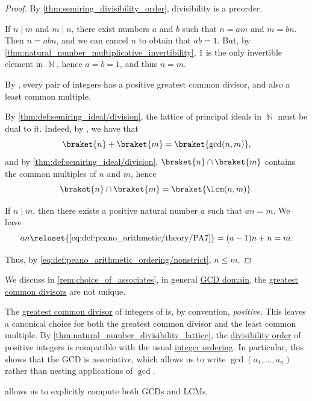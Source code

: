 \begin{proof}
  By \cref{thm:semiring_divisibility_order}, divisibility is a preorder.

   If \( n \mid m \) and \( m \mid n \), there exist numbers \( a \) and \( b \) such that \( n = am \) and \( m = bn \). Then \( n = abn \), and we can cancel \( n \) to obtain that \( ab = 1 \). But, by \cref{thm:natural_number_multiplicative_invertibility}, \( 1 \) is the only invertible element in \( \BbbN \), hence \( a = b = 1 \), and thus \( n = m \).

   By , every pair of integers has a positive greatest common divisor, and also a least common multiple.

  By \cref{thm:def:semiring_ideal/division}, the lattice of principal ideals in \( \BbbN \) must be dual to it. Indeed, by , we have that
  \begin{equation*}
    \braket{n} + \braket{m} = \braket{ \gcd(n, m) },
  \end{equation*}
  and by \cref{thm:def:semiring_ideal/division}, \( \braket{n} \cap \braket{m} \) contains the common multiples of \( n \) and \( m \), hence
  \begin{equation*}
    \braket{n} \cap \braket{m} = \braket{ \lcm(n, m) }.
  \end{equation*}

   If \( n \mid m \), then there exists a positive natural number \( a \) such that \( an = m \). We have
  \begin{equation*}
    an
    \reloset {\eqref{eq:def:peano_arithmetic/theory/PA7}} =
    (a - 1)n + n
    =
    m.
  \end{equation*}

  Thus, by \eqref{eq:def:peano_arithmetic_ordering/nonstrict}, \( n \leq m \).
\end{proof}

\begin{remark}\label{rem:integer_gcd}
  We discuss in \cref{rem:choice_of_associates}, in general \hyperref[def:gcd_domain]{GCD domain}, the \hyperref[def:gcd]{greatest common divisors} are not unique.

  The \hyperref[def:gcd]{greatest common divisor} of integers of is, by convention, \emph{positive}. This leaves a canonical choice for both the greatest common divisor and the least common multiple. By \cref{thm:natural_number_divisibility_lattice}, the \hyperref[thm:semiring_divisibility_order]{divisibility order} of positive integers is compatible with the usual \hyperref[def:integer_ordering]{integer ordering}. In particular, this shows that the GCD is associative, which allows us to write \( \gcd(a_1, \ldots, a_n) \) rather than nesting applications of \( \gcd \).

   allows us to explicitly compute both GCDs and LCMs.
\end{remark}

